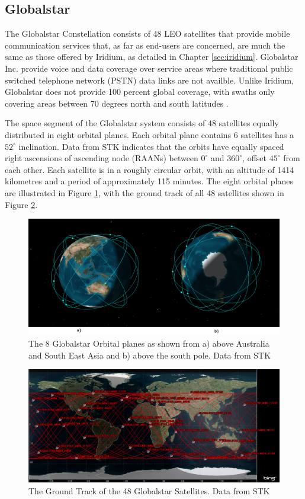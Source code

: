 \subsection{Globalstar}
The Globalstar Constellation consists of 48 LEO satellites that provide mobile communication services that, as far as end-users are concerned, are much the same as those offered by Iridium, as detailed in Chapter \ref{sec:iridium}. Globalstar Inc. provide voice and data coverage over service areas where traditional public switched telephone network (PSTN) data links are not availble. Unlike Iridium, Globalstar does not provide 100 percent global coverage, with swaths only covering areas between $70$ degrees north and south latitudes \cite{Dietrich1998}.

The space segment of the Globalstar system consists of 48 satellites equally distributed in eight orbital planes. Each orbital plane contains 6 satellites has a $52^\circ$ inclination\cite{Smith1996, Dietrich1998}. Data from STK indicates that the orbits have equally spaced right ascensions of ascending node (RAANs) between $0^\circ$ and $360^ \circ$, offset $45^\circ$ from each other. Each satellite is in a roughly circular orbit, with an altitude of 1414 kilometres \cite{Smith1996} and a period of approximately 115 minutes. The eight orbital planes are illustrated in Figure \ref{fig:globalstar_stk}, with the ground track of all 48 satellites shown in Figure \ref{fig:globalstar_2d_stk}.
\begin{figure}[H]
	\centering
	\includegraphics[scale = 0.40]{Pictures/globalstar_stk.png}
	
	\caption{The 8 Globalstar Orbital planes as shown from a) above Australia and South East Asia and b) above the south pole. Data from STK}
	\label{fig:globalstar_stk}
\end{figure}

\begin{figure}[H]
	\centering
	\includegraphics[scale = 0.40]{Pictures/globalstar_2d_stk.png}
	
	\caption{The Ground Track of the 48 Globalstar Satellites. Data from STK}
	\label{fig:globalstar_2d_stk}
\end{figure}


